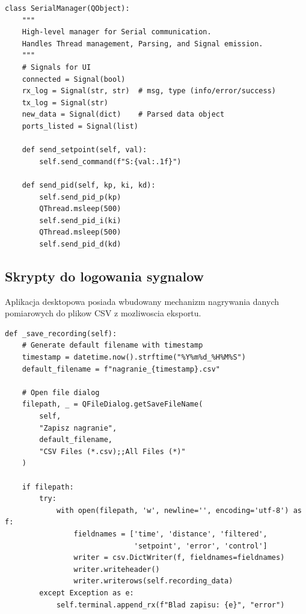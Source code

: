 \documentclass[11pt]{article}
\begin{document}
\begin{lstlisting}[caption={Manager komunikacji szeregowej (serial\_manager.py)}, style=pythonstyle]
class SerialManager(QObject):
    """
    High-level manager for Serial communication. 
    Handles Thread management, Parsing, and Signal emission.
    """
    # Signals for UI
    connected = Signal(bool)
    rx_log = Signal(str, str)  # msg, type (info/error/success)
    tx_log = Signal(str)
    new_data = Signal(dict)    # Parsed data object
    ports_listed = Signal(list)
    
    def send_setpoint(self, val):
        self.send_command(f"S:{val:.1f}")
        
    def send_pid(self, kp, ki, kd):
        self.send_pid_p(kp)
        QThread.msleep(500)
        self.send_pid_i(ki)
        QThread.msleep(500)
        self.send_pid_d(kd)
\end{lstlisting}

\subsection{Skrypty do logowania sygnalow}

Aplikacja desktopowa posiada wbudowany mechanizm nagrywania danych pomiarowych do plikow CSV z mozliwoscia eksportu.

\begin{lstlisting}[caption={Funkcja zapisu nagrania do CSV (app.py)}, style=pythonstyle]
def _save_recording(self):
    # Generate default filename with timestamp
    timestamp = datetime.now().strftime("%Y%m%d_%H%M%S")
    default_filename = f"nagranie_{timestamp}.csv"
    
    # Open file dialog
    filepath, _ = QFileDialog.getSaveFileName(
        self,
        "Zapisz nagranie",
        default_filename,
        "CSV Files (*.csv);;All Files (*)"
    )
    
    if filepath:
        try:
            with open(filepath, 'w', newline='', encoding='utf-8') as f:
                fieldnames = ['time', 'distance', 'filtered', 
                              'setpoint', 'error', 'control']
                writer = csv.DictWriter(f, fieldnames=fieldnames)
                writer.writeheader()
                writer.writerows(self.recording_data)
        except Exception as e:
            self.terminal.append_rx(f"Blad zapisu: {e}", "error")
\end{lstlisting}
\end{document}
